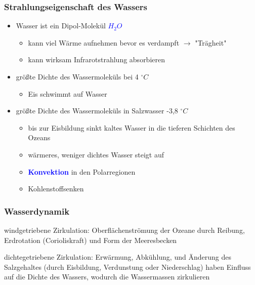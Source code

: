 \begin{frame}
	\frametitle{Strahlungseigenschaft des Wassers} %
	\begin{itemize}
		\item Wasser ist ein Dipol-Molekül \textcolor{blue}{$H_2O$}
		\begin{itemize}			
			\item<2->[$\rightarrow$] kann viel Wärme aufnehmen bevor es verdampft $\rightarrow$ "Trägheit"
			\item<2->[$\rightarrow$] kann wirksam Infrarotstrahlung absorbieren
		\end{itemize}
		
		\item<3-> größte Dichte des Wassermoleküls bei 4 $^{\circ} C$ 
		\begin{itemize}
			\item<4->[$\rightarrow$] Eis schwimmt auf Wasser
		\end{itemize}		
		\item<5-> größte Dichte des Wassermoleküls in Salzwasser -3,8 $^{\circ} C$
		\begin{itemize}
			\item<6->[$\rightarrow$] bis zur Eisbildung sinkt kaltes Wasser in die tieferen Schichten des Ozeans
			\item<6-> [$\rightarrow$] wärmeres, weniger dichtes Wasser steigt auf
			\item<6-> [] \textbf{\textcolor{blue}{Konvektion}} in den Polarregionen 
			\item<6-> [$\rightarrow$] Kohlenstoffsenken
		\end{itemize}
	\end{itemize}


\end{frame}

\begin{frame}
	\frametitle{Wasserdynamik} %
	\begin{block}{windgetriebene Zirkulation: } %
		Oberflächenströmung der Ozeane durch Reibung, Erdrotation (Corioliskraft) und Form der Meeresbecken 
	\end{block}
	\begin{block}{dichtegetriebene Zirkulation: }  %
		Erwärmung, Abkühlung, und Änderung des Salzgehaltes (durch Eisbildung, Verdunstung oder Niederschlag) haben Einfluss auf die Dichte des Wassers, wodurch die Wassermassen zirkulieren
	\end{block}
	
\end{frame}



